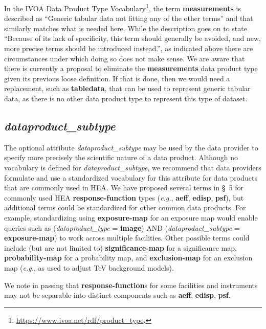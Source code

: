 \documentclass[11pt,a4paper]{ivoa}
\begin{document}
In the \gls{IVOA} Data Product Type Vocabulary\footnote{\url{https://www.ivoa.net/rdf/product_type}.}, the term {\bf measurements} is described as ``Generic tabular data not fitting any of the other terms'' and that similarly matches what is needed here.  While the description goes on to state ``Because of its lack of specificity, this term should generally be avoided, and new, more precise terms should be introduced instead.'', as indicated above there are circumstances under which doing so does not make sense.  We are aware that there is currently a proposal to eliminate the {\bf measurements} data product type given its previous loose definition.  If that is done, then we would need a replacement, such as {\bf tabledata\/}, that can be used to represent generic tabular data, as there is no other data product type to represent this type of dataset.

\subsection{{\em dataproduct\_subtype}}

The optional attribute {\em dataproduct\_subtype} may be used by the data provider to specify more precisely the scientific nature of a data product.  Although no vocabulary is defined for {\em dataproduct\_subtype\/}, we recommend that data providers formulate and use a standardized vocabulary for this attribute for data products that are commonly used in \gls{HEA}\null.  We have proposed several terms in \S~5 for commonly used \gls{HEA} {\bf response-function} types ({\em e.g.\/}, {\bf aeff}, {\bf edisp}, {\bf psf}), but additional terms could be standardized for other common data products.  For example, standardizing using {\bf exposure-map} for an exposure map would enable queries such as  ({\em dataproduct\_type\/} = {\bf image}) AND ({\em dataproduct\_subtype\/} = {\bf exposure-map}) to work across multiple facilities.  Other possible terms could include (but are not limited to) {\bf significance-map} for a significance map, {\bf probability-map} for a probability map, and {\bf exclusion-map} for an exclusion map ({\em e.g.\/}, as used to adjust TeV background models).

We note in passing that {\bf response-function}s for some facilities and instruments may not be separable into distinct components such as {\bf aeff}, {\bf edisp}, {\bf psf}.
\end{document}
